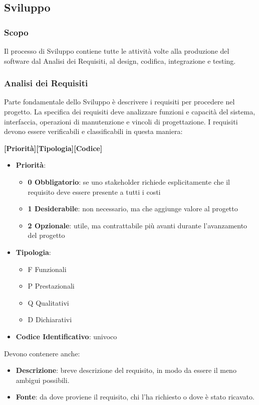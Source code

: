 \subsection{Sviluppo}
\subsubsection{Scopo}
Il processo di Sviluppo contiene tutte le attività volte alla produzione del software dal Analisi dei Requisiti, al  design, codifica, integrazione e testing.
\subsubsection{Analisi dei Requisiti}
Parte fondamentale dello Sviluppo è descrivere i requisiti per procedere nel progetto. La specifica dei requisiti deve analizzare funzioni e capacità del sistema, interfaccia, operazioni di manutenzione e vincoli di progettazione. I requisiti devono essere verificabili e classificabili in questa maniera:

\centerline{\textbf{[Priorità][Tipologia][Codice]}}
\begin{itemize}
  \item \textbf{Priorità}:
  \begin{itemize}
    \item \textbf{0 Obbligatorio}: se uno stakeholder richiede esplicitamente che il requisito deve essere presente a tutti i costi
    \item \textbf{1 Desiderabile}: non necessario, ma che aggiunge valore al progetto
    \item \textbf{2 Opzionale}: utile, ma contrattabile più avanti durante l'avanzamento del progetto
  \end{itemize}
  \item \textbf{Tipologia}:
  \begin{itemize}
    \item F Funzionali
    \item P Prestazionali
    \item Q Qualitativi
    \item D Dichiarativi
  \end{itemize}
  \item \textbf{Codice Identificativo}: univoco
\end{itemize}
Devono contenere anche:
\begin{itemize}
  \item \textbf{Descrizione}: breve descrizione del requisito, in modo da essere il meno ambigui possibili.
  \item \textbf{Fonte}: da dove proviene il requisito, chi l'ha richiesto o dove è stato ricavato.
\end{itemize}
